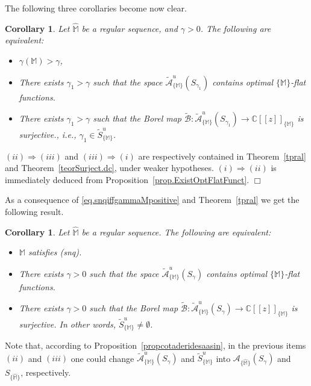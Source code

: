 \documentclass[11pt,a4paper]{article}
\theoremstyle{plain}
\newtheorem{coro}[theo]{Corollary}
\theoremstyle{definition}
\newenvironment{proof1}{\medskip\par\noindent{\bf Proof.}}{\hfill $\Box$
\medskip\par}
\newcommand{\C}{\mathbb{C}}
\newcommand{\M}{\mathbb{M}}
\newcommand{\hM}{\widehat{\M}}
\def\ga{\gamma}
\begin{document}
The following three corollaries become now clear.

\begin{coro}
Let $\hM$ be a regular sequence,
and $\ga>0$. The following are equivalent:
\begin{itemize}
\item[$(i)$] $\gamma(\M)>\gamma$,

\item[$(ii)$] There exists $\gamma_1>\gamma$ such that the space $\widetilde{\mathcal{A}}^u_{\{\M\}}(S_{\gamma_1})$ contains optimal $\{\M\}$-flat functions.

\item[$(iii)$] There exists $\gamma_1>\gamma$ such  that the Borel map $\widetilde{\mathcal{B}}:\widetilde{\mathcal{A}}^u_{\{\M\}}(S_{\gamma_1})\to \C[[z]]_{\{\M\}}$ is surjective., i.e., $\gamma_1\in\widetilde{S}^u_{\{\M\}}$.
\end{itemize}
\end{coro}

\begin{proof1}
$(ii)\Rightarrow(iii)$ and $(iii)\Rightarrow(i)$ are respectively contained in Theorem~\ref{tpral} and Theorem~\ref{teorSurject.dc}, under weaker hypotheses.
$(i)\Rightarrow(ii)$ is immediately deduced from Proposition~\ref{prop.ExistOptFlatFunct}.
\end{proof1}

As a consequence of \eqref{eq.snqiffgammaMpositive}
and Theorem~\ref{tpral} we get the following result.


\begin{coro}\label{coro.optimalflat}
Let $\hM$ be a regular sequence.
The following are equivalent:
\begin{itemize}
\item[$(i)$] $\M$ satisfies (snq).

\item[$(ii)$] There exists $\gamma>0$ such that the space $\widetilde{\mathcal{A}}^u_{\{\M\}}(S_{\gamma})$ contains optimal $\{\M\}$-flat functions.

\item[$(iii)$] There exists $\gamma>0$ such that the Borel map $\widetilde{\mathcal{B}}:\widetilde{\mathcal{A}}^u_{\{\M\}}(S_{\gamma})\to \C[[z]]_{\{\M\}}$ is surjective. In other words, $\widetilde{S}^u_{\{\M\}}\neq\emptyset$.
\end{itemize}
\end{coro}

Note that, according to Proposition~\ref{propcotaderidesaasin}, in the previous items $(ii)$ and $(iii)$ one could change $\widetilde{\mathcal{A}}^u_{\{\M\}}(S_{\gamma})$ and $\widetilde{S}^u_{\{\M\}}$ into $\mathcal{A}_{\{\hM\}}(S_{\gamma})$ and $S_{\{\hM\}}$, respectively.
\end{document}
